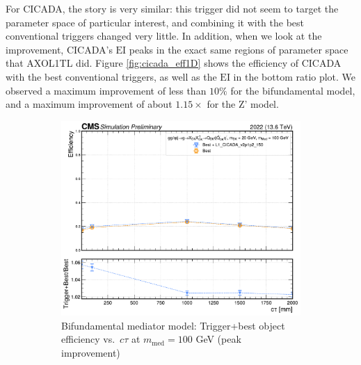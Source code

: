 For CICADA, the story is very similar: this trigger did not seem to target the parameter space of particular interest, and combining it with the best conventional triggers changed very little. In addition, when we look at the improvement, CICADA's $\text{EI}$ peaks in the exact same regions of parameter space that AXOL1TL did. Figure \ref{fig:cicada_eff1D} shows the efficiency of CICADA with the best conventional triggers, as well as the $\text{EI}$ in the bottom ratio plot. We observed a maximum improvement of less than $10\%$ for the bifundamental model, and a maximum improvement of about $1.15\times$ for the Z' model.

\begin{figure}[H]
  \centering

  \begin{subfigure}[t]{0.45\textwidth}
    \centering
    \includegraphics[width=\linewidth]{images/L1/ad_1D_tchan/trigeffplots1D_L1_efftype-trigplusbest_t-channel_mDark-20_mMed-100_L1_CICADA_v2p1p2_150_study_cloppear.pdf}
    \caption{Bifundamental mediator model: Trigger+best object efficiency vs.\ $c\tau$ at $m_\mathrm{med} = 100$ GeV (peak improvement)}
    \label{fig:cicada_eff1D_tchan}
  \end{subfigure}
  \hfill
  \begin{subfigure}[t]{0.45\textwidth}
    \centering

\end{subfigure}
\end{figure}
